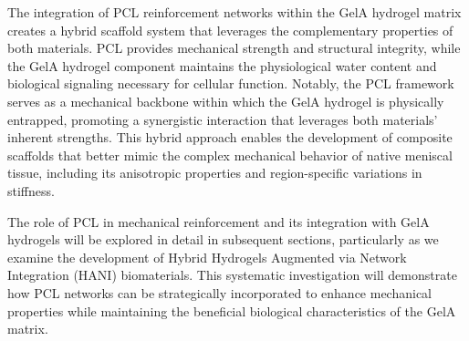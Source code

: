 The integration of PCL reinforcement networks within the GelA hydrogel matrix creates a hybrid scaffold system that leverages the complementary properties of both materials. PCL provides mechanical strength and structural integrity, while the GelA hydrogel component maintains the physiological water content and biological signaling necessary for cellular function. Notably, the PCL framework serves as a mechanical backbone within which the GelA hydrogel is physically entrapped, promoting a synergistic interaction that leverages both materials' inherent strengths. This hybrid approach enables the development of composite scaffolds that better mimic the complex mechanical behavior of native meniscal tissue, including its anisotropic properties and region-specific variations in stiffness.

The role of PCL in mechanical reinforcement and its integration with GelA hydrogels will be explored in detail in subsequent sections, particularly as we examine the development of Hybrid Hydrogels Augmented via Network Integration (HANI) biomaterials. This systematic investigation will demonstrate how PCL networks can be strategically incorporated to enhance mechanical properties while maintaining the beneficial biological characteristics of the GelA matrix.


